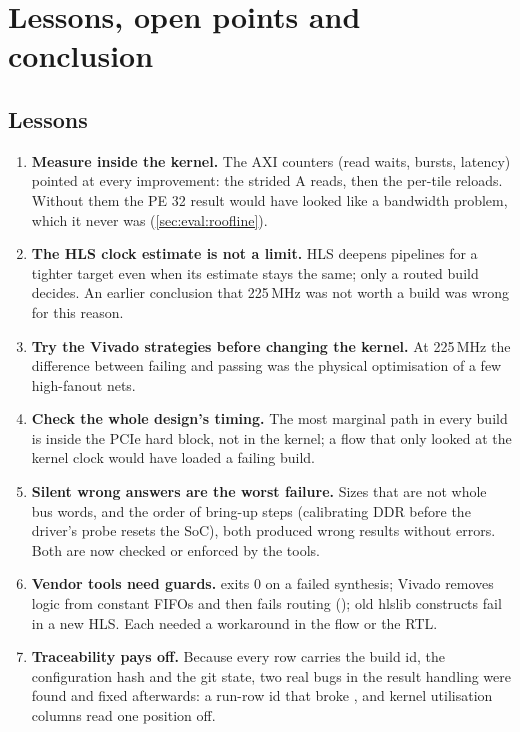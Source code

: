 \section{Lessons, open points and conclusion}
\label{sec:lessons}

\subsection{Lessons}
\begin{enumerate}[leftmargin=1.4em]
  \item \textbf{Measure inside the kernel.} The AXI counters (read waits, bursts, latency) pointed at every
        improvement: the strided A reads, then the per-tile reloads. Without them the PE 32 result would have
        looked like a bandwidth problem, which it never was (\cref{sec:eval:roofline}).
  \item \textbf{The HLS clock estimate is not a limit.} HLS deepens pipelines for a tighter target even when its
        estimate stays the same; only a routed build decides. An earlier conclusion that 225\,MHz was not worth a
        build was wrong for this reason.
  \item \textbf{Try the Vivado strategies before changing the kernel.} At 225\,MHz the difference between failing and
        passing was the physical optimisation of a few high-fanout nets.
  \item \textbf{Check the whole design's timing.} The most marginal path in every build is inside the PCIe hard block,
        not in the kernel; a flow that only looked at the kernel clock would have loaded a failing build.
  \item \textbf{Silent wrong answers are the worst failure.} Sizes that are not whole bus words, and the order of
        bring-up steps (calibrating DDR before the driver's probe resets the SoC), both produced wrong results without
        errors. Both are now checked or enforced by the tools.
  \item \textbf{Vendor tools need guards.}  exits 0 on a failed synthesis; Vivado removes logic from
        constant FIFOs and then fails routing (); old hlslib constructs fail in a new HLS. Each
        needed a workaround in the flow or the RTL.
  \item \textbf{Traceability pays off.} Because every row carries the build id, the configuration hash and the git
        state, two real bugs in the result handling were found and fixed afterwards: a run-row id that broke
        , and kernel utilisation columns read one position off.
\end{enumerate}

